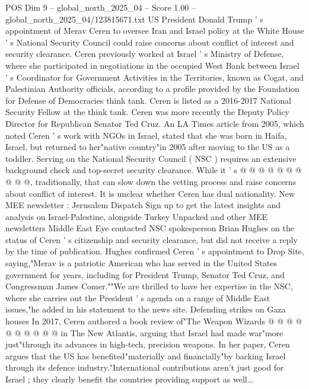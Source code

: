 \begin{textsample}{POS Dim 9 – global\_north\_2025\_04 – Score 1.00 – global\_north\_2025\_04/123815671.txt}  \label{ex:f9_pos_323}
US President Donald Trump ' s appointment of Merav Ceren to oversee Iran and Israel policy at the White House ' s National Security Council could raise concerns about conflict of interest and security clearance.
Ceren previously worked at Israel ' s Ministry of Defense, where she participated in negotiations in the occupied West Bank between Israel ' s Coordinator for Government Activities in the Territories, known as Cogat, and Palestinian Authority officials, according to a profile provided by the Foundation for Defense of Democracies think tank.
Ceren is listed as a 2016-2017 National Security Fellow at the think tank.
Ceren was more recently the Deputy Policy Director for Republican Senator Ted Cruz.
An LA Times article from 2005, which noted Ceren ' s work with NGOs in Israel, stated that she was born in Haifa, Israel, but returned to her"native country"in 2005 after moving to the US as a toddler.
Serving on the National Security Council ( NSC ) requires an extensive background check and top-secret security clearance.
While it ' s @ @ @ @ @ @ @ @ @ @, traditionally, that can slow down the vetting process and raise concerns about conflict of interest.
It is unclear whether Ceren has dual nationality.
New MEE newsletter : Jerusalem Dispatch Sign up to get the latest insights and analysis on Israel-Palestine, alongside Turkey Unpacked and other MEE newsletters Middle East Eye contacted NSC spokesperson Brian Hughes on the status of Ceren ' s citizenship and security clearance, but did not receive a reply by the time of publication.
Hughes confirmed Ceren ' s appointment to Drop Site, saying,"Merav is a patriotic American who has served in the United States government for years, including for President Trump, Senator Ted Cruz, and Congressman James Comer.""We are thrilled to have her expertise in the NSC, where she carries out the President ' s agenda on a range of Middle East issues,"he added in his statement to the news site.
Defending strikes on Gaza houses In 2017, Ceren authored a book review of"The Weapon Wizards @ @ @ @ @ @ @ @ @ @ in The New Atlantis, arguing that Israel had made war"more just"through its advances in high-tech, precision weapons.
In her paper, Ceren argues that the US has benefited"materially and financially"by backing Israel through its defence industry."International contributions aren't just good for Israel ; they clearly benefit the countries providing support as well...

\end{textsample}
